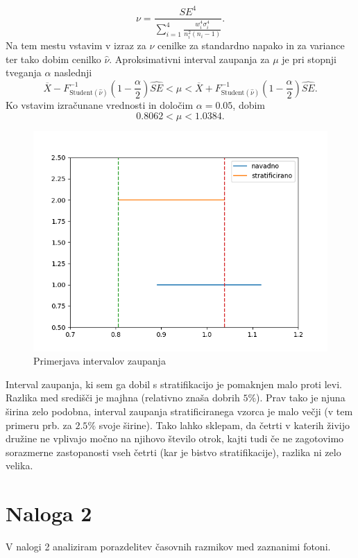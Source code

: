 \documentclass[12pt, a4paper]{article}
\begin{document}
\[
\nu = \frac{SE^4}{\sum_{i = 1}^4 \frac{w_i^4 \sigma_i^4}{n_i^2(n_i-1)}}.
\]
Na tem mestu vstavim v izraz za $\nu$ cenilke za standardno napako in za variance ter tako dobim cenilko $\widehat{\nu}$. Aproksimativni interval zaupanja za $\mu$ je pri stopnji tveganja $\alpha$ naslednji
\[
\overline{X} - F^{-1}_{\text{Student}(\widehat{\nu})}\left(1-\frac{\alpha}{2}\right)\widehat{SE} 
< \mu <
\overline{X} + F^{-1}_{\text{Student}(\widehat{\nu})}\left(1-\frac{\alpha}{2}\right)\widehat{SE}.
\]
Ko vstavim izračunane vrednosti in določim $\alpha = 0.05$, dobim
\[
0.8062 < \mu < 1.0384.
\]
\begin{figure}[h!]
\includegraphics[width=\linewidth]{intervala_prva.png}
\centering
\caption{Primerjava intervalov zaupanja}
\end{figure}
Interval zaupanja, ki sem ga dobil s stratifikacijo je pomaknjen malo proti levi. Razlika med središči je majhna (relativno znaša dobrih $5\%$). Prav tako je njuna širina zelo podobna, interval zaupanja stratificiranega vzorca je malo večji (v tem primeru prb. za $2.5\%$ svoje širine). Tako lahko sklepam, da četrti v katerih živijo družine ne vplivajo močno na njihovo število otrok, kajti tudi če ne zagotovimo sorazmerne zastopanosti vseh četrti (kar je bistvo stratifikacije), razlika ni zelo velika.

\section*{Naloga 2}
V nalogi 2 analiziram porazdelitev časovnih razmikov med zaznanimi fotoni.
\end{document}

